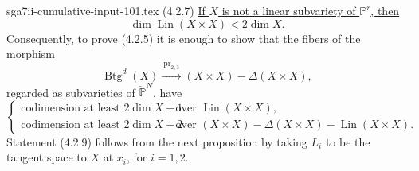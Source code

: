 \begin{filecontents*}{sga7ii-cumulative-input-101.tex}
\medskip
\noindent(4.2.7) \underline{If $X$ is not a linear subvariety of
$\mathbb P^r$, then}
\[
\dim\operatorname{Lin}(X\times X)<2\dim X.
\]
Consequently, to prove (4.2.5) it is enough to show that the fibers of
the morphism
\begin{equation}\tag{4.2.8}
\operatorname{Btg}^{d}(X)
\xrightarrow{\ \operatorname{pr}_{2,3}\ }
(X\times X)-\Delta(X\times X),
\end{equation}
regarded as subvarieties of $\check{\mathbb P}^{N}$, have
\begin{equation}\tag{4.2.9}
\left\{
\begin{array}{ll}
\text{codimension at least $2\dim X+1$}
 &\text{over $\operatorname{Lin}(X\times X)$},\\[1ex]
\text{codimension at least $2\dim X+2$}
 &\text{over $(X\times X)-\Delta(X\times X)
                 -\operatorname{Lin}(X\times X)$.}
\end{array}
\right.
\end{equation}
Statement (4.2.9) follows from the next proposition by taking $L_i$
to be the tangent space to $X$ at $x_i$, for $i=1,2$.
\end{filecontents*}
